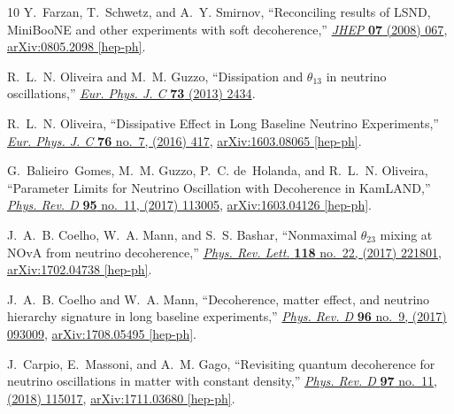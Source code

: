 \documentclass[aps, prd, onecolumn, tightenlines, notitlepage, superscriptaddress, nofootinbib, preprintnumbers, floatfix,showkeys,11pt]{revtex4-2}
\begin{document}
\begin{thebibliography}{10}
Y.~Farzan, T.~Schwetz, and A.~Y. Smirnov, ``{Reconciling results of LSND,
  MiniBooNE and other experiments with soft decoherence},''
  \href{http://dx.doi.org/10.1088/1126-6708/2008/07/067}{{\em JHEP} {\bfseries
  07} (2008) 067}, \href{http://arxiv.org/abs/0805.2098}{{\ttfamily
  arXiv:0805.2098 [hep-ph]}}.

R.~L.~N. Oliveira and M.~M. Guzzo, ``{Dissipation and $\theta_{13}$ in neutrino
  oscillations},'' \href{http://dx.doi.org/10.1140/epjc/s10052-013-2434-6}{{\em
  Eur. Phys. J. C} {\bfseries 73} (2013) 2434}.

R.~L.~N. Oliveira, ``{Dissipative Effect in Long Baseline Neutrino
  Experiments},'' \href{http://dx.doi.org/10.1140/epjc/s10052-016-4253-z}{{\em
  Eur. Phys. J. C} {\bfseries 76} no.~7, (2016) 417},
  \href{http://arxiv.org/abs/1603.08065}{{\ttfamily arXiv:1603.08065
  [hep-ph]}}.

G.~Balieiro~Gomes, M.~M. Guzzo, P.~C. de~Holanda, and R.~L.~N. Oliveira,
  ``{Parameter Limits for Neutrino Oscillation with Decoherence in KamLAND},''
  \href{http://dx.doi.org/10.1103/PhysRevD.95.113005}{{\em Phys. Rev. D}
  {\bfseries 95} no.~11, (2017) 113005},
  \href{http://arxiv.org/abs/1603.04126}{{\ttfamily arXiv:1603.04126
  [hep-ph]}}.

J.~A.~B. Coelho, W.~A. Mann, and S.~S. Bashar, ``{Nonmaximal $\theta_{23}$
  mixing at NOvA from neutrino decoherence},''
  \href{http://dx.doi.org/10.1103/PhysRevLett.118.221801}{{\em Phys. Rev.
  Lett.} {\bfseries 118} no.~22, (2017) 221801},
  \href{http://arxiv.org/abs/1702.04738}{{\ttfamily arXiv:1702.04738
  [hep-ph]}}.

J.~A.~B. Coelho and W.~A. Mann, ``{Decoherence, matter effect, and neutrino
  hierarchy signature in long baseline experiments},''
  \href{http://dx.doi.org/10.1103/PhysRevD.96.093009}{{\em Phys. Rev. D}
  {\bfseries 96} no.~9, (2017) 093009},
  \href{http://arxiv.org/abs/1708.05495}{{\ttfamily arXiv:1708.05495
  [hep-ph]}}.

J.~Carpio, E.~Massoni, and A.~M. Gago, ``{Revisiting quantum decoherence for
  neutrino oscillations in matter with constant density},''
  \href{http://dx.doi.org/10.1103/PhysRevD.97.115017}{{\em Phys. Rev. D}
  {\bfseries 97} no.~11, (2018) 115017},
  \href{http://arxiv.org/abs/1711.03680}{{\ttfamily arXiv:1711.03680
  [hep-ph]}}.


\end{thebibliography}
\end{document}
